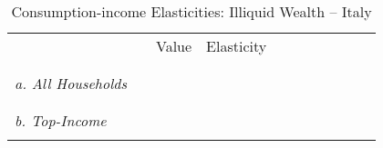 \documentclass[12pt]{article}
\begin{document}
\begin{spacing}{1.5}
\begin{table}[H]
\begin{centering}
\caption{Consumption-income Elasticities: Illiquid Wealth -- Italy
{\label{tab_elasticities_illiquidwealth_italy}}}
\vspace*{-0.2em}
\begin{tabular}{lll >{\centering\arraybackslash} p{2.0cm}  >{\centering\arraybackslash} p{2cm} >{\centering\arraybackslash} p{.2cm} >{\centering\arraybackslash} p{2cm} >{\centering\arraybackslash} p{2cm} >{\centering\arraybackslash} p{2cm} >{\centering\arraybackslash} p{.0cm} >{\centering\arraybackslash} p{.0cm} >{\centering\arraybackslash} p{.0cm}}
\toprule
 & &  & Value & \hspace{.3em} Elasticity \hspace{.3em} \tabularnewline
\vspace{-1cm} \\
\hline
\vspace{-.9em} \\
\multicolumn{2}{l}{\textit{a.  All Households}} \vspace{.3em} \\

\vspace{-.9em} \\

\hline
\vspace{-.9em} \\
\multicolumn{2}{l}{\textit{b.  Top-Income}} \vspace{.3em} \\

\vspace{-.9em} \\

\toprule
\end{tabular}  \\

\par\end{centering}
\medskip{}


\end{table}
\end{spacing}
\end{document}
